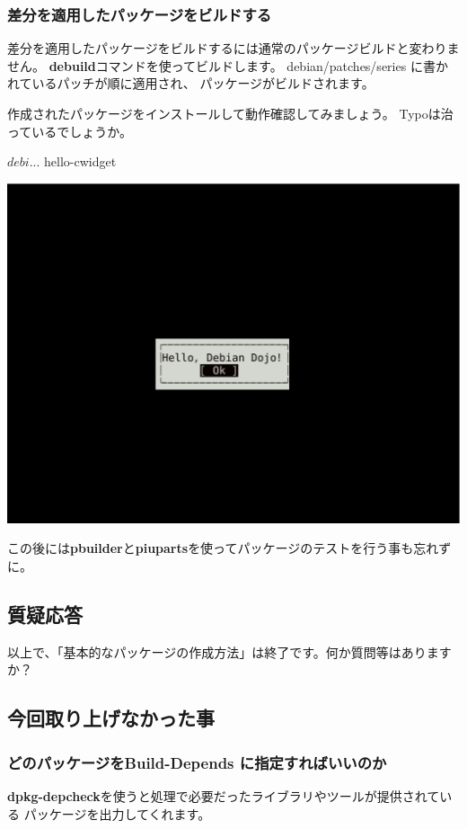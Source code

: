 \documentclass[mingoth,a4paper]{jsarticle}
\begin{document}
\subsubsection{差分を適用したパッケージをビルドする}

差分を適用したパッケージをビルドするには通常のパッケージビルドと変わりません。
{\bf debuild}コマンドを使ってビルドします。
debian/patches/series に書かれているパッチが順に適用され、
パッケージがビルドされます。


作成されたパッケージをインストールして動作確認してみましょう。
Typoは治っているでしょうか。

\begin{terminal}
$ debi
...
$ hello-cwidget
\end{terminal}
\begin{center}
\includegraphics[width=0.5\hsize]{image201209/hello-debian.eps}
\end{center}

この後には{\bf pbuilder}と{\bf piuparts}を使ってパッケージのテストを行う事も忘れずに。

\subsection{質疑応答}
以上で、「基本的なパッケージの作成方法」は終了です。何か質問等はありますか？

\subsection{今回取り上げなかった事}

\subsubsection{どのパッケージをBuild-Depends に指定すればいいのか}
{\bf dpkg-depcheck}を使うと処理で必要だったライブラリやツールが提供されている
パッケージを出力してくれます。
\end{document}
